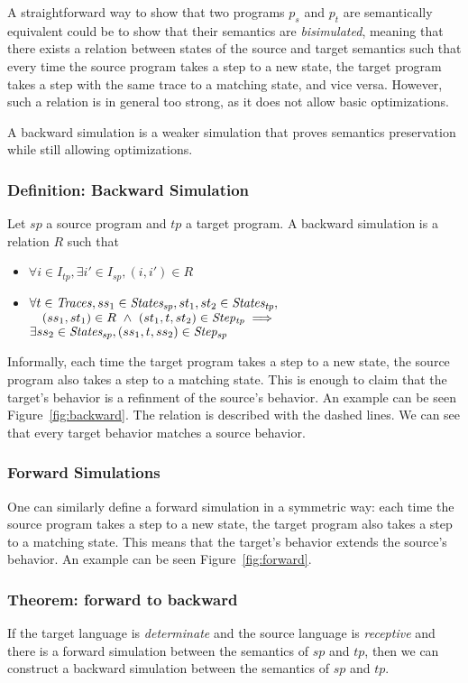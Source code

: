 A straightforward way to show that two programs $p_s$ and $p_t$ are semantically equivalent could be to show that their semantics are \textit{bisimulated}, meaning that there exists a relation between states of the source and target semantics such that every time the source program takes a step to a new state, the target program takes a step with the same trace to a matching state, and vice versa. However, such a relation is in general too strong, as it does not allow basic optimizations.

A backward simulation is a weaker simulation that proves semantics preservation while still allowing optimizations.

\subsubsection{Definition: Backward Simulation} Let $sp$ a source program and $tp$ a target program. A backward simulation is a relation $R$ such that
\begin{itemize}
\item $\forall i\in I_{tp}, \exists i'\in I_{sp}, (i,i')\in R$
\item $\forall t\in\mathit{Traces}, ss_1\in\mathit{States_{sp}},st_1,st_2\in\mathit{States_{tp}},$\\
      $\quad(ss_1,st_1)\in R~\wedge~(st_1,t,st_2)\in\mathit{Step_{tp}}\implies$\\
      $\exists ss_2\in\mathit{States_{sp}}, (ss_1,t,ss_2)\in\mathit{Step_{sp}}$
\end{itemize}
Informally, each time the target program takes a step to a new state, the source program also takes a step to a matching state. This is enough to claim that the target's behavior is a refinment of the source's behavior. An example can be seen Figure~\ref{fig:backward}. The relation is described with the dashed lines. We can see that every target behavior matches a source behavior.

\subsubsection{Forward Simulations} One can similarly define a forward simulation in a symmetric way: each time the source program takes a step to a new state, the target program also takes a step to a matching state. This means that the target's behavior extends the source's behavior. An example can be seen Figure~\ref{fig:forward}.

\backwardforward


\subsubsection{Theorem: forward to backward} If the target language is \textit{determinate} and the source language is \textit{receptive} and there is a forward simulation between the semantics of $sp$ and $tp$, then we can construct a backward simulation between the semantics of $sp$ and $tp$. 

